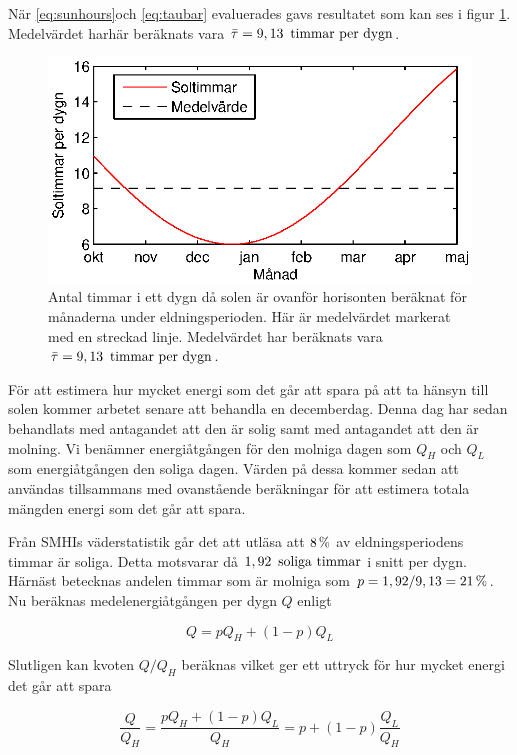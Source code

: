 \noindent
När \eqref{eq:sunhours}och \eqref{eq:taubar} evaluerades gavs 
resultatet som kan ses i figur \ref{fig:sunhours}.
Medelvärdet harhär beräknats vara $\bar{\tau}=\unit[9,13]{~timmar~per~dygn}$.
\begin{figure}
\centering
\includegraphics{images/sunhours.eps}
\caption{Antal timmar i ett dygn då solen är ovanför horisonten beräknat för månaderna under eldningsperioden.
Här är medelvärdet markerat med en streckad linje. Medelvärdet har beräknats vara
$\bar{\tau}=\unit[9,13]{~timmar~per~dygn}$.}
\label{fig:sunhours}
\end{figure}

\noindent
För att estimera hur mycket energi som det går att spara på att ta hänsyn till solen kommer arbetet
senare att behandla en decemberdag. Denna dag har sedan behandlats med antagandet att den är solig samt
med antagandet att den är molning. Vi benämner energiåtgången för den molniga dagen som $Q_H$ och
$Q_L$ som energiåtgången den soliga dagen. Värden på dessa kommer sedan att användas tillsammans med
ovanstående beräkningar för att estimera totala mängden energi som det går att spara. 

Från SMHIs väderstatistik går det att utläsa att $\unit[8]{\%}$ av eldningsperiodens timmar är soliga.\cite{SMHIdata}
Detta motsvarar då $\unit[1,92]{~soliga~timmar}$ i snitt per dygn. Härnäst betecknas andelen timmar som är molniga som
$p = 1,92/9,13 = \unit[21]{\%}$. Nu beräknas medelenergiåtgången per dygn $Q$ enligt

\begin{equation}
Q = pQ_H + (1-p)Q_L
\end{equation}

\noindent
Slutligen kan kvoten $Q/Q_H$ beräknas vilket ger ett uttryck för hur mycket energi det går att spara

\begin{equation}
\frac{Q}{Q_H} = \frac{pQ_H + (1-p)Q_L}{Q_H} = p+(1-p)\frac{Q_L}{Q_H}
\end{equation}

